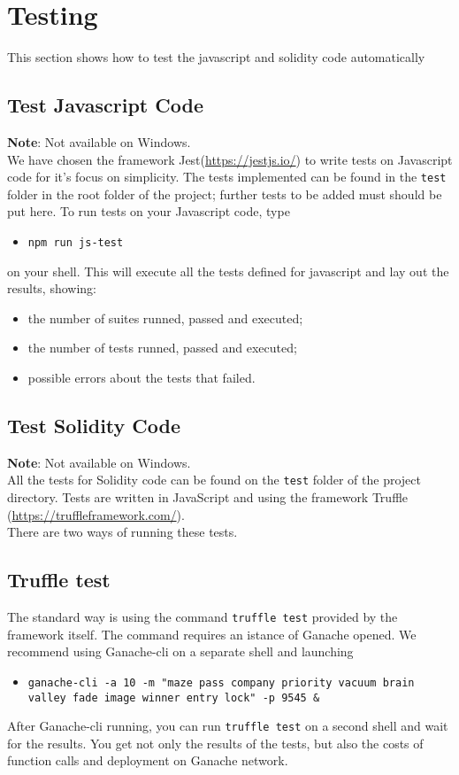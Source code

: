 \section{Testing}
This section shows how to test the javascript and solidity code automatically

\subsection{Test Javascript Code}
\textbf{Note}: Not available on Windows. \\
We have chosen the framework Jest(\url{https://jestjs.io/}) to write tests on Javascript code for it's focus on simplicity. 
The tests implemented can be found in the \texttt{test} folder in the root folder of the project; further tests to be added must should be put here.
To run tests on your Javascript code, type
\begin{itemize}
	\item[]\texttt{npm run js-test}
\end{itemize}
on your shell. 
This will execute all the tests defined for javascript and lay out the results, showing:
\begin{itemize}
	\item the number of suites runned, passed and executed;
	\item the number of tests runned, passed and executed;
	\item possible errors about the tests that failed.
\end{itemize}

\subsection{Test Solidity Code}
\textbf{Note}: Not available on Windows. \\
All the tests for Solidity code can be found on the \texttt{test} folder of the project directory. Tests are written in JavaScript and using the framework Truffle (\url{https://truffleframework.com/}).\\
There are two ways of running these tests.
\subsection{Truffle test}
The standard way is using the command \texttt{truffle test} provided by the framework itself. The command requires an istance of Ganache opened. We recommend using Ganache-cli on a separate shell and launching 
\begin{itemize}
	\item[]\texttt{ganache-cli -a 10 -m "maze pass company priority vacuum brain valley fade image winner entry lock"  -p 9545 \&}
\end{itemize}
After Ganache-cli running, you can run \texttt{truffle test} on a second shell and wait for the results. You get not only the results of the tests, but also the costs of function calls and deployment on Ganache network.

